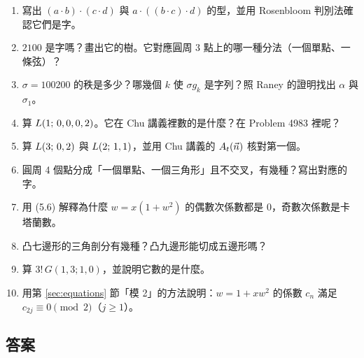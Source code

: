 \begin{enumerate}[leftmargin=1.8em,label=\textbf{\arabic*.}]
  \item 寫出 $(a\cdot b)\cdot(c\cdot d)$ 與 $a\cdot((b\cdot c)\cdot d)$ 的型，並用 Rosenbloom 判別法確認它們是字。
  \item $2100$ 是字嗎？畫出它的樹。它對應圓周 3 點上的哪一種分法（一個單點、一條弦）？
  \item $\sigma=100200$ 的秩是多少？哪幾個 $k$ 使 $\sigma g_k$ 是字列？照 Raney 的證明找出 $\alpha$ 與 $\sigma_1$。
  \item 算 $L(1;\,0,0,0,2)$。它在 Chu 講義裡數的是什麼？在 Problem 4983 裡呢？
  \item 算 $L(3;\,0,2)$ 與 $L(2;\,1,1)$，並用 Chu 講義的 $A_t(\vec n)$ 核對第一個。
  \item 圓周 4 個點分成「一個單點、一個三角形」且不交叉，有幾種？寫出對應的字。
  \item 用 (5.6) 解釋為什麼 $w=x(1+w^2)$ 的偶數次係數都是 0，奇數次係數是卡塔蘭數。
  \item 凸七邊形的三角剖分有幾種？凸九邊形能切成五邊形嗎？
  \item 算 $3!\,G(1,3;1,0)$，並說明它數的是什麼。
  \item 用第 \ref{sec:equations} 節「模 2」的方法說明：$w=1+xw^2$ 的係數 $c_n$ 滿足 $c_{2j}\equiv0\pmod2$（$j\ge1$）。
\end{enumerate}

\newpage
\subsection*{答案}

